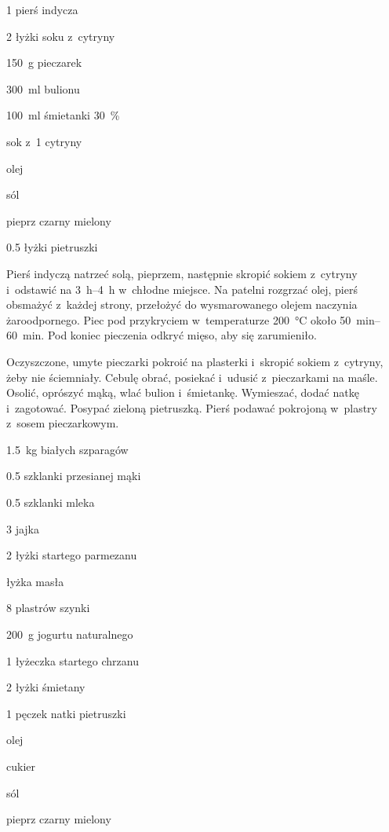 \documentclass[../kucharek.tex]{subfiles}
\begin{document}

\begin{Ingred}
    \item \num{1} pierś indycza
    \item \num{2} łyżki soku z~cytryny
    \item \qty{150}{\gram} pieczarek
    \item \qty{300}{\milli\litre} bulionu
    \item \qty{100}{\milli\litre} śmietanki \qty{30}{\percent}
    \item sok z~\num{1} cytryny
    \item olej
    \item sól
    \item pieprz czarny mielony
    \item \num{.5} łyżki pietruszki
\end{Ingred}

Pierś indyczą natrzeć solą, pieprzem, następnie skropić sokiem z~cytryny
i~odstawić na \qtyrange{3}{4}{\hour} w~chłodne miejsce. Na patelni rozgrzać
olej, pierś obsmażyć z~każdej strony, przełożyć do wysmarowanego olejem
naczynia żaroodpornego. Piec pod przykryciem w~temperaturze \qty{200}{\celsius}
około \qtyrange{50}{60}{\minute}. Pod koniec pieczenia odkryć mięso, aby się
zarumieniło.

Oczyszczone, umyte pieczarki pokroić na plasterki i~skropić sokiem z~cytryny,
żeby nie ściemniały. Cebulę obrać, posiekać i~udusić z~pieczarkami na maśle.
Osolić, oprószyć mąką, wlać bulion i~śmietankę. Wymieszać, dodać natkę
i~zagotować. Posypać zieloną pietruszką. Pierś podawać pokrojoną w~plastry
z~sosem pieczarkowym.


\begin{Ingred}
    \item \qty{1.5}{\kilo\gram} białych szparagów
    \item \num{.5} szklanki przesianej mąki
    \item \num{.5} szklanki mleka
    \item \num{3} jajka
    \item \num{2} łyżki startego parmezanu
    \item łyżka masła
    \item \num{8} plastrów szynki
    \item \qty{200}{\gram} jogurtu naturalnego
    \item \num{1} łyżeczka startego chrzanu
    \item \num{2} łyżki śmietany
    \item \num{1} pęczek natki pietruszki
    \item olej
    \item cukier
    \item sól
    \item pieprz czarny mielony
\end{Ingred}
\end{document}
